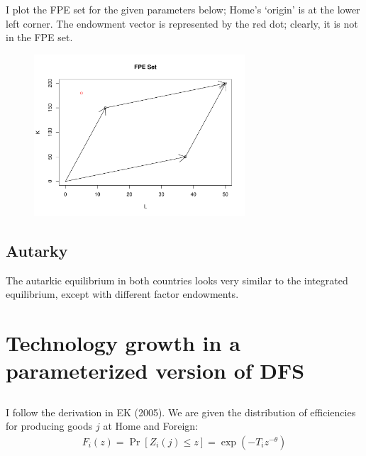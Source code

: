 \documentclass[12pt]{article}
\begin{document}
I plot the FPE set for the given parameters below; Home's `origin' is at the lower left corner. The endowment vector is represented by the red dot; clearly, it is not in the FPE set.

\begin{figure}[!htpb]
    \centering
    
        \includegraphics[width=0.7\textwidth]{fpeset.pdf}

\end{figure}

\subsection{Autarky}
The autarkic equilibrium in both countries looks very similar to the integrated equilibrium, except with different factor endowments. 


\newpage

\section{Technology growth in a parameterized version of DFS}

\subsection{}
I follow the derivation in EK (2005). We are given the distribution of efficiencies for producing goods $j$ at Home and Foreign:
\begin{align*}
F_i(z)=\Pr[Z_i(j) \leq z ] = \exp(-T_iz^{-\theta})
\end{align*}

\end{document}

